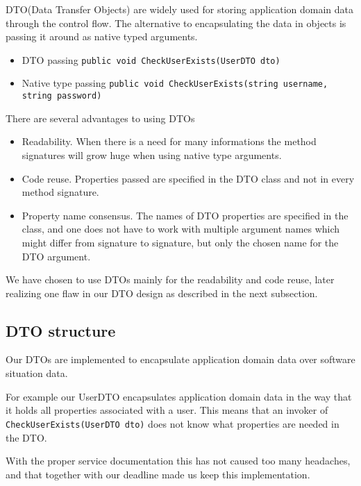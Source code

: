 \documentclass[../report.tex]{subfiles}
\begin{document}
\label{sec:dto}



DTO(Data Transfer Objects) are widely used for storing application domain data through the control flow. The alternative to encapsulating the data in objects is passing it around as native typed arguments.

\begin{itemize}
\item DTO passing
\subitem \texttt{public void CheckUserExists(UserDTO dto)}

\item Native type passing
\subitem \texttt{public void CheckUserExists(string username, string password)}
\end{itemize}

There are several advantages to using DTOs

\begin{itemize}
\item Readability. When there is a need for many informations the method signatures will grow huge when using native type arguments.
\item Code reuse. Properties passed are specified in the DTO class and not in every method signature.
\item Property name consensus. The names of DTO properties are specified in the class, and one does not have to work with multiple argument names which might differ from signature to signature, but only the chosen name for the DTO argument.
\end{itemize}

We have chosen to use DTOs mainly for the readability and code reuse, later realizing one flaw in our DTO design as described in the next subsection.


\subsection{DTO structure}

Our DTOs are implemented to encapsulate application domain data over software situation data.

For example our UserDTO encapsulates application domain data in the way that it holds all properties associated with a user. This means that an invoker of \texttt{CheckUserExists(UserDTO dto)} does not know what properties are needed in the DTO.

With the proper service documentation this has not caused too many headaches, and that together with our deadline made us keep this implementation.
\end{document}
